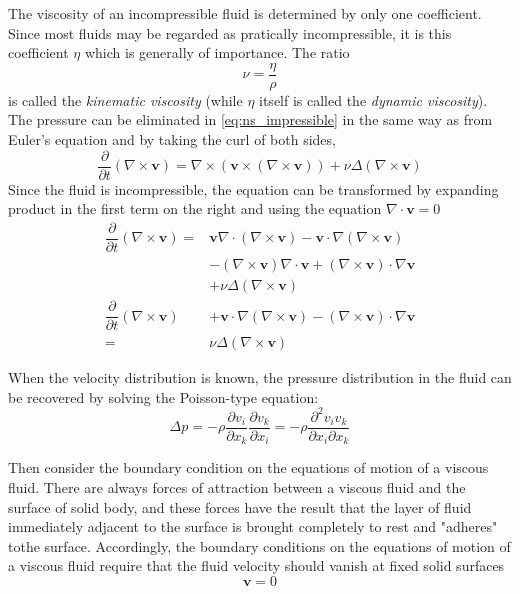 \documentclass[conference]{IEEEtran}
\theoremstyle{definition}
\theoremstyle{remark}
\begin{document}
    The viscosity of an incompressible fluid is determined by only one coefficient. Since most fluids may be regarded as pratically incompressible, it is this coefficient $\eta$ which is generally of importance. The ratio
    \[
        \nu = \dfrac{\eta}{\rho}
    \]
    is called the \emph{kinematic viscosity} (while $\eta$ itself is called the \emph{dynamic viscosity}). The pressure can be eliminated in \ref{eq:ns_impressible} in the same way as from Euler's equation and by taking the curl of both sides, 
    \[
        \dfrac{\partial}{\partial t} (\nabla \times \mathbf{v}) = \nabla \times (\mathbf{v} \times (\nabla \times \mathbf{v})) + \nu \Delta (\nabla \times \mathbf{v})
    \]
    Since the fluid is incompressible, the equation can be transformed by expanding product in the first term on the right and using the equation $\nabla \cdot \mathbf{v} = 0$
    \begin{align}
        \dfrac{\partial}{\partial t} (\nabla \times \mathbf{v}) =& \mathbf{v} \nabla \cdot (\nabla \times \mathbf{v}) - \mathbf{v} \cdot \nabla (\nabla \times \mathbf{v}) \nonumber \\
        &- (\nabla \times \mathbf{v}) \nabla \cdot \mathbf{v} + (\nabla \times \mathbf{v}) \cdot \nabla \mathbf{v} \nonumber \\
        &+ \nu \Delta (\nabla \times \mathbf{v}) \nonumber \\
        \dfrac{\partial}{\partial t} (\nabla \times \mathbf{v}) &+ \mathbf{v} \cdot \nabla (\nabla \times \mathbf{v}) -  (\nabla \times \mathbf{v}) \cdot \nabla \mathbf{v} \nonumber \\
        =& \nu \Delta (\nabla \times \mathbf{v})
    \end{align}

    When the velocity distribution is known, the pressure distribution in the fluid can be recovered by solving the Poisson-type equation:
    \begin{equation}
        \Delta p = -\rho \dfrac{\partial v_i}{\partial x_k} \dfrac{\partial v_k}{\partial x_i} = -\rho \dfrac{\partial^2 v_iv_k}{\partial x_i \partial x_k}
    \end{equation}

    Then consider the boundary condition on the equations of motion of a viscous fluid. There are always forces of attraction between a viscous fluid and the surface of solid body, and these forces have the result that the layer of fluid immediately adjacent to the surface is brought completely to rest and "adheres" tothe surface. Accordingly, the boundary conditions on the equations of motion of a viscous fluid require that the fluid velocity should vanish at fixed solid surfaces
    \begin{equation}
        \mathbf{v} = 0
    \end{equation}
\end{document}

